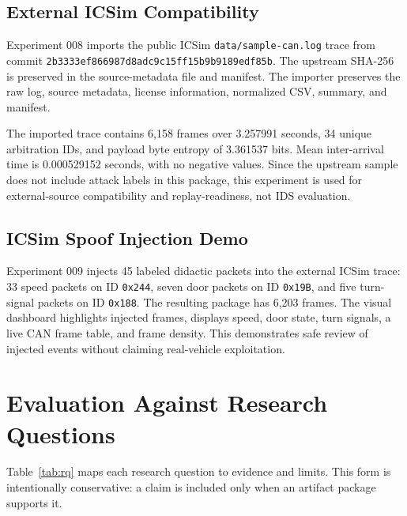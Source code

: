 \documentclass[conference]{IEEEtran}
\begin{document}
\subsection{External ICSim Compatibility}
Experiment 008 imports the public ICSim \texttt{data/sample-can.log} trace from commit \texttt{2b3333ef866987d8adc9c15ff15b9b9189edf85b}. The upstream SHA-256 is preserved in the source-metadata file and manifest. The importer preserves the raw log, source metadata, license information, normalized CSV, summary, and manifest.

The imported trace contains 6,158 frames over 3.257991 seconds, 34 unique arbitration IDs, and payload byte entropy of 3.361537 bits. Mean inter-arrival time is 0.000529152 seconds, with no negative values. Since the upstream sample does not include attack labels in this package, this experiment is used for external-source compatibility and replay-readiness, not IDS evaluation.

\subsection{ICSim Spoof Injection Demo}
Experiment 009 injects 45 labeled didactic packets into the external ICSim trace: 33 speed packets on ID \texttt{0x244}, seven door packets on ID \texttt{0x19B}, and five turn-signal packets on ID \texttt{0x188}. The resulting package has 6,203 frames. The visual dashboard highlights injected frames, displays speed, door state, turn signals, a live CAN frame table, and frame density. This demonstrates safe review of injected events without claiming real-vehicle exploitation.

\section{Evaluation Against Research Questions}
Table~\ref{tab:rq} maps each research question to evidence and limits. This form is intentionally conservative: a claim is included only when an artifact package supports it.
\end{document}
